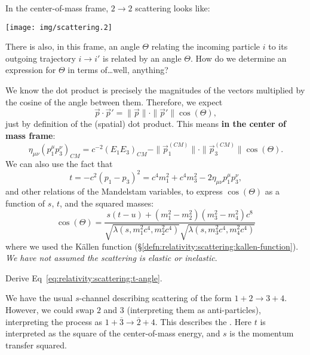 \M
In the center-of-mass frame, $2\to2$ scattering looks like:
\begin{center}
\texttt{[image: img/scattering.2]}
\end{center}
There is also, in this frame, an angle $\Theta$ relating the incoming
particle $i$ to its outgoing trajectory $i\to i'$ is related by an angle
$\Theta$. How do we determine an expression for $\Theta$ in terms
of\dots well, anything?

We know the dot product is precisely the magnitudes of the vectors
multiplied by the cosine of the angle between them. Therefore, we expect
\begin{equation}
\vec{p}\cdot\vec{p}' = \|\vec{p}\|\cdot\|\vec{p}'\|\cos(\Theta),
\end{equation}
just by definition of the (spatial) dot product. This means
\textbf{in the center of mass frame}:
\begin{equation}
\eta_{\mu\nu}(p_{1}^{\mu}p_{3}^{\nu})_{CM} = c^{-2}(E_{1}E_{3})_{CM} - 
\|\vec{p}_{1}^{(CM)}\|\cdot\|\vec{p}_{3}^{(CM)}\|\cos(\Theta).
\end{equation}
We can also use the fact that
\begin{equation}
  t = -c^{2}(p_{1} - p_{3})^{2}
  = c^{4}m_{1}^{2} + c^{4}m_{3}^{2} - 2\eta_{\mu\nu}p_{1}^{\mu}p_{3}^{\nu},
\end{equation}
and other relations of the Mandelstam variables, to express
$\cos(\Theta)$ as a function of $s$, $t$, and the squared masses:
\begin{equation}\label{eq:relativity:scattering:t-angle}
\cos(\Theta) = \frac{s(t - u) + (m_{1}^{2} - m_{2}^{2})(m_{3}^{2} - m_{4}^{2})c^{8}}{\sqrt{\lambda(s,m_{1}^{2}c^{4},m_{2}^{2}c^{4})}\sqrt{\lambda(s,m_{3}^{2}c^{4},m_{4}^{2}c^{4})}}
\end{equation}
where we used the K\"{a}llen function (\S\ref{defn:relativity:scattering:kallen-function}).
\emph{We have not assumed the scattering is elastic or inelastic}.

\begin{exercise}
Derive Eq~\eqref{eq:relativity:scattering:t-angle}.
\end{exercise}

We have the usual $s$-channel describing scattering of the form $1+2\to 3+4$.
However, we could swap $2$ and $3$ (interpreting them as
anti-particles), interpreting the process as
$1+\overline{3}\to\overline{2}+4$. This describes the .
Here $t$ is interpreted as the square of the center-of-mass energy, and
$s$ is the momentum transfer squared.


